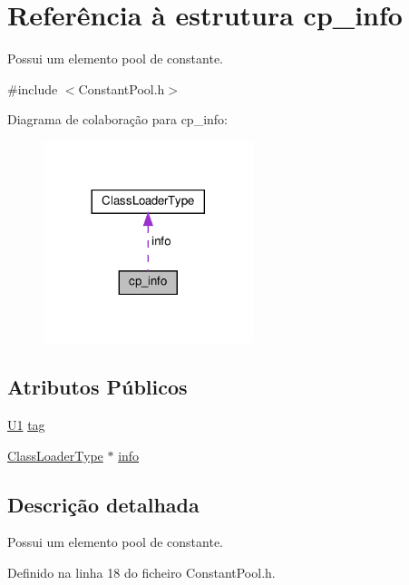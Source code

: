 \hypertarget{structcp__info}{}\section{Referência à estrutura cp\+\_\+info}
\label{structcp__info}


Possui um elemento pool de constante.  




{\ttfamily \#include $<$Constant\+Pool.\+h$>$}



Diagrama de colaboração para cp\+\_\+info\+:
\nopagebreak
\begin{figure}[H]
\begin{center}
\leavevmode
\includegraphics[width=173pt]{structcp__info__coll__graph}
\end{center}
\end{figure}
\subsection*{Atributos Públicos}
\begin{DoxyCompactItemize}
\item 
\hyperlink{BasicTypes_8h_a9bffe5bb2564f91cd90fb7d06848f9a8}{U1} \hyperlink{structcp__info_a850b66fa196e9fc2e898ca41d558e248}{tag}
\item 
\hyperlink{unionClassLoaderType}{Class\+Loader\+Type} $\ast$ \hyperlink{structcp__info_aafa07de27e22632ed56ab8fbffbe2559}{info}
\end{DoxyCompactItemize}


\subsection{Descrição detalhada}
Possui um elemento pool de constante. 

Definido na linha 18 do ficheiro Constant\+Pool.\+h.



